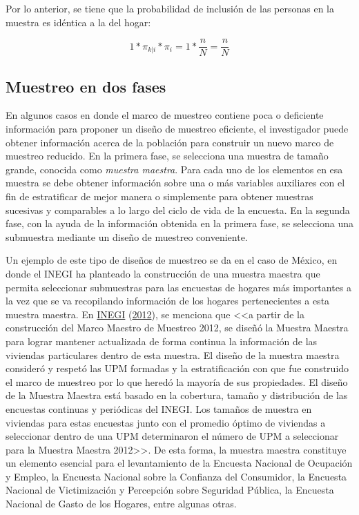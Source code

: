 \documentclass[
  12pt,
  spanish,
]{book}
\begin{document}
Por lo anterior, se tiene que la probabilidad de inclusión de las personas en la muestra es idéntica a la del hogar:

\[1 * \pi_{k|i} * \pi_i = 1 * \frac{n}{N} = \frac{n}{N}\]

\hypertarget{muestreo-en-dos-fases}{%
\subsection*{Muestreo en dos fases}\label{muestreo-en-dos-fases}}

En algunos casos en donde el marco de muestreo contiene poca o deficiente información para proponer un diseño de muestreo eficiente, el investigador puede obtener información acerca de la población para construir un nuevo marco de muestreo reducido. En la primera fase, se selecciona una muestra de tamaño grande, conocida como \emph{muestra maestra}. Para cada uno de los elementos en esa muestra se debe obtener información sobre una o más variables auxiliares con el fin de estratificar de mejor manera o simplemente para obtener muestras sucesivas y comparables a lo largo del ciclo de vida de la encuesta. En la segunda fase, con la ayuda de la información obtenida en la primera fase, se selecciona una submuestra mediante un diseño de muestreo conveniente.

Un ejemplo de este tipo de diseños de muestreo se da en el caso de México, en donde el INEGI ha planteado la construcción de una muestra maestra que permita seleccionar submuestras para las encuestas de hogares más importantes a la vez que se va recopilando información de los hogares pertenecientes a esta muestra maestra. En \protect\hyperlink{ref-INEGI_MX_2012}{INEGI} (\protect\hyperlink{ref-INEGI_MX_2012}{2012}), se menciona que \textless\textless a partir de la construcción del Marco Maestro de Muestreo 2012, se diseñó la Muestra Maestra para lograr mantener actualizada de forma continua la información de las viviendas particulares dentro de esta muestra. El diseño de la muestra maestra consideró y respetó las UPM formadas y la estratificación con que fue construido el marco de muestreo por lo que heredó la mayoría de sus propiedades. El diseño de la Muestra Maestra está basado en la cobertura, tamaño y distribución de las encuestas continuas y periódicas del INEGI. Los tamaños de muestra en viviendas para estas encuestas junto con el promedio óptimo de viviendas a seleccionar dentro de una UPM determinaron el número de UPM a seleccionar para la Muestra Maestra 2012\textgreater\textgreater. De esta forma, la muestra maestra constituye un elemento esencial para el levantamiento de la Encuesta Nacional de Ocupación y Empleo, la Encuesta Nacional sobre la Confianza del Consumidor, la Encuesta Nacional de Victimización y Percepción sobre Seguridad Pública, la Encuesta Nacional de Gasto de los Hogares, entre algunas otras.
\end{document}

